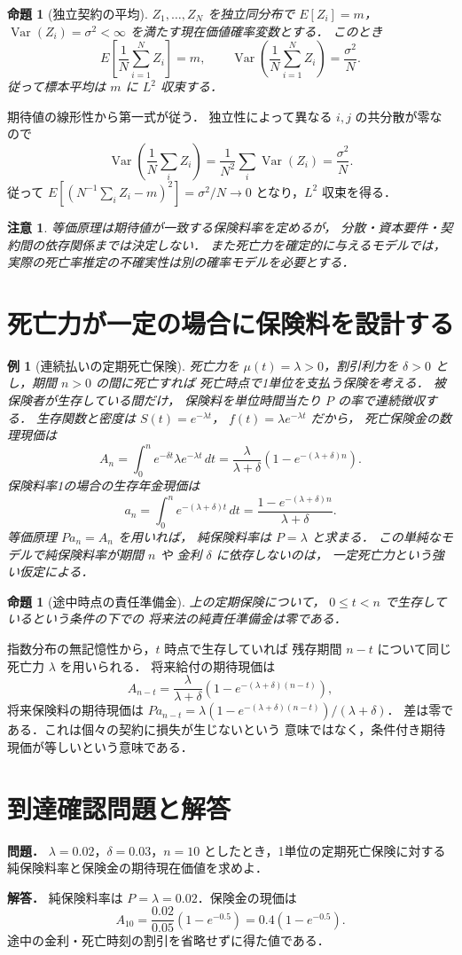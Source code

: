 \documentclass[a5paper,10pt,onecolumn]{jsarticle}
\makeatletter
\theoremstyle{mathnotetheorem}
\newtheorem{proposition}[theorem]{命題}
\newtheorem{example}[theorem]{例}
\newtheorem{remark}[theorem]{注意}
\renewcommand{\proofname}{証明}
\renewenvironment{proof}[1][\proofname]{%
  \par\pushQED{\qed}\normalfont\topsep4\p@\@plus2\p@\relax
  \trivlist\item[\hskip\labelsep\bfseries #1]\ignorespaces
}{\popQED\endtrivlist\@endpefalse}
\makeatother
\begin{document}
\begin{proposition}[独立契約の平均]\label{prop:portfolio}
$Z_1,\dots,Z_N$ を独立同分布で
$E[Z_i]=m$，
$\operatorname{Var}(Z_i)=\sigma^2<\infty$
を満たす現在価値確率変数とする．
このとき
\[
 E\left[\frac1N\sum_{i=1}^NZ_i\right]=m,\qquad
 \operatorname{Var}\left(\frac1N\sum_{i=1}^NZ_i\right)
 =\frac{\sigma^2}N.
\]
従って標本平均は $m$ に $L^2$ 収束する．
\end{proposition}
\begin{proof}
期待値の線形性から第一式が従う．
独立性によって異なる $i,j$ の共分散が零なので
\[
 \operatorname{Var}\left(\frac1N\sum_iZ_i\right)
 =\frac1{N^2}\sum_i\operatorname{Var}(Z_i)
 =\frac{\sigma^2}N.
\]
従って
$E[(N^{-1}\sum_iZ_i-m)^2]=\sigma^2/N\to0$
となり，$L^2$ 収束を得る．
\end{proof}

\begin{remark}
等価原理は期待値が一致する保険料率を定めるが，
分散・資本要件・契約間の依存関係までは決定しない．
また死亡力を確定的に与えるモデルでは，
実際の死亡率推定の不確実性は別の確率モデルを必要とする．
\end{remark}

\section{死亡力が一定の場合に保険料を設計する}
\begin{example}[連続払いの定期死亡保険]
死亡力を $\mu(t)=\lambda>0$，割引利力を
$\delta>0$ とし，期間 $n>0$ の間に死亡すれば
死亡時点で1単位を支払う保険を考える．
被保険者が生存している間だけ，
保険料を単位時間当たり $P$ の率で連続徴収する．
生存関数と密度は
$S(t)=e^{-\lambda t}$，
$f(t)=\lambda e^{-\lambda t}$ だから，
死亡保険金の数理現価は
\[
 A_n=\int_0^n e^{-\delta t}\lambda e^{-\lambda t}\,dt
 =\frac{\lambda}{\lambda+\delta}
   (1-e^{-(\lambda+\delta)n}).
\]
保険料率1の場合の生存年金現価は
\[
 a_n=\int_0^n e^{-(\lambda+\delta)t}\,dt
 =\frac{1-e^{-(\lambda+\delta)n}}{\lambda+\delta}.
\]
等価原理 $P a_n=A_n$ を用いれば，
純保険料率は $P=\lambda$ と求まる．
この単純なモデルで純保険料率が期間 $n$ や
金利 $\delta$ に依存しないのは，
一定死亡力という強い仮定による．
\end{example}
\begin{proposition}[途中時点の責任準備金]
上の定期保険について，
$0\le t<n$ で生存しているという条件の下での
将来法の純責任準備金は零である．
\end{proposition}
\begin{proof}
指数分布の無記憶性から，$t$ 時点で生存していれば
残存期間 $n-t$ について同じ死亡力 $\lambda$ を用いられる．
将来給付の期待現価は
\[
 A_{n-t}=\frac{\lambda}{\lambda+\delta}
                 (1-e^{-(\lambda+\delta)(n-t)}),
\]
将来保険料の期待現価は
$P a_{n-t}=\lambda(1-e^{-(\lambda+\delta)(n-t)})
/(\lambda+\delta)$．
差は零である．これは個々の契約に損失が生じないという
意味ではなく，条件付き期待現価が等しいという意味である．
\end{proof}
\section*{到達確認問題と解答}
\noindent\textbf{問題．}
$\lambda=0.02$，$\delta=0.03$，$n=10$
としたとき，1単位の定期死亡保険に対する
純保険料率と保険金の期待現在価値を求めよ．

\medskip\noindent\textbf{解答．}
純保険料率は $P=\lambda=0.02$．保険金の現価は
\[
 A_{10}=\frac{0.02}{0.05}(1-e^{-0.5})
 =0.4(1-e^{-0.5}).
\]
途中の金利・死亡時刻の割引を省略せずに得た値である．
\end{document}

